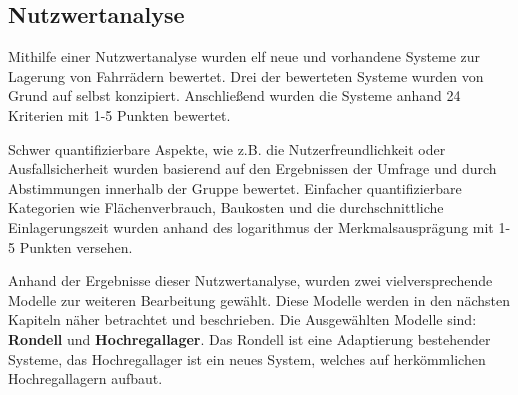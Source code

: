 \subsection{Nutzwertanalyse}

Mithilfe einer Nutzwertanalyse wurden elf neue und vorhandene Systeme zur
Lagerung von Fahrrädern bewertet. Drei der bewerteten Systeme wurden von Grund
auf selbst konzipiert. Anschließend wurden die Systeme anhand 24 Kriterien mit 1-5
Punkten bewertet.

Schwer quantifizierbare Aspekte, wie z.B. die Nutzerfreundlichkeit oder
Ausfallsicherheit wurden basierend auf den Ergebnissen der Umfrage und durch
Abstimmungen innerhalb der Gruppe bewertet. Einfacher quantifizierbare Kategorien
wie Flächenverbrauch, Baukosten und die durchschnittliche Einlagerungszeit wurden
anhand des logarithmus der Merkmalsausprägung mit 1-5 Punkten versehen.







Anhand der Ergebnisse dieser Nutzwertanalyse, wurden zwei vielversprechende
Modelle zur weiteren Bearbeitung gewählt. Diese Modelle werden in den nächsten Kapiteln näher betrachtet und beschrieben. Die Ausgewählten Modelle sind: \textbf{Rondell} und \textbf{Hochregallager}. Das Rondell ist eine Adaptierung bestehender Systeme, das Hochregallager ist ein neues System, welches auf herkömmlichen Hochregallagern aufbaut.